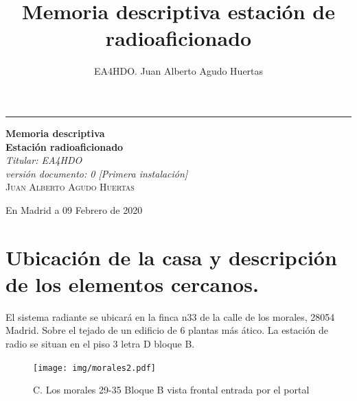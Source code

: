 \documentclass[letterpaper, 10pt]{article} %
\title{Memoria descriptiva estación de radioaficionado}
\author{EA4HDO. Juan Alberto Agudo Huertas}
\begin{document}

\begin{titlepage} %
	
	\raggedleft %
	
	\rule{1pt}{\textheight} %
	\hspace{0.05\textwidth} %
	\parbox[b]{0.90\textwidth}{ %
		
		{\Huge\bfseries Memoria descriptiva \\[0.5\baselineskip] Estación radioaficionado}\\[2\baselineskip] %
		{\large\textit{Titular: EA4HDO \\ versión documento: 0 [Primera instalación] }}\\[4\baselineskip] %
		{\Large\textsc{Juan Alberto Agudo Huertas}} %
		
		\vspace{0.5\textheight} %
		
		{\noindent En Madrid a 09 Febrero de 2020}\\[\baselineskip] %
	}

\end{titlepage}


\tableofcontents

\newpage

\section{Ubicación de la casa y descripción de los elementos cercanos.}
El sistema radiante se ubicará en la finca n33 de la calle de los morales, 28054 Madrid. Sobre el tejado de un edificio de 6 plantas más ático. La estación de radio se situan en el piso 3 letra D bloque B.
%

\begin{figure}[h!]
\centering
\texttt{[image: img/morales2.pdf]}
\caption{C. Los morales 29-35 Bloque B vista frontal entrada por el portal }
\label{fig:morales1}
\end{figure}
\end{document}
